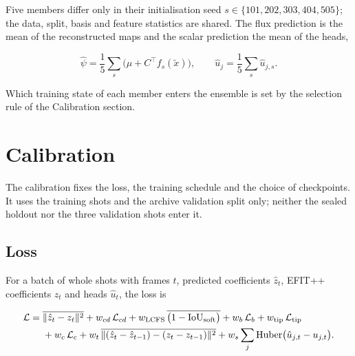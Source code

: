 \documentclass[11pt,a4paper]{article}
\numberwithin{equation}{section}
\begin{document}
Five members differ only in their initialisation seed \(s\in\{101,202,303,404,505\}\); the data, split, basis and feature statistics are shared. The flux prediction is the mean of the reconstructed maps and the scalar prediction the mean of the heads,

\[
\hat\psi = \frac15\sum_{s}\Big(\mu+C^{\top}f_s(\tilde x)\Big),\qquad
\hat u_j = \frac15\sum_s \hat u_{j,s}.
\]

Which training state of each member enters the ensemble is set by the selection rule of the Calibration section.

\hypertarget{calibration}{%
\clearpage
\section{Calibration}\label{calibration}}

The calibration fixes the loss, the training schedule and the choice of checkpoints. It uses the training shots and the archive validation split only; neither the sealed holdout nor the three validation shots enter it.

\hypertarget{loss}{%
\subsection{Loss}\label{loss}}

For a batch of whole shots with frames \(t\), predicted coefficients \(\hat z_t\), EFIT++ coefficients \(z_t\) and heads \(\hat u_t\), the loss is

\begin{equation}
\begin{aligned}
\mathcal L ={}& \overline{\|\hat z_t-z_t\|^2}
 + w_{cd}\,\mathcal L_{cd} + w_{\rm LCFS}\,\overline{\big(1-\mathrm{IoU}_{\rm soft}\big)}
 + w_b\,\mathcal L_{b} + w_{\rm tip}\,\mathcal L_{\rm tip}\\
&+ w_c\,\mathcal L_{c} + w_t\,\overline{\|(\hat z_t-\hat z_{t-1})-(z_t-z_{t-1})\|^2}
 + w_s\sum_j \mathrm{Huber}\big(\hat u_{j,t}-u_{j,t}\big).
\end{aligned}
\label{eq:loss}
\end{equation}
\end{document}
